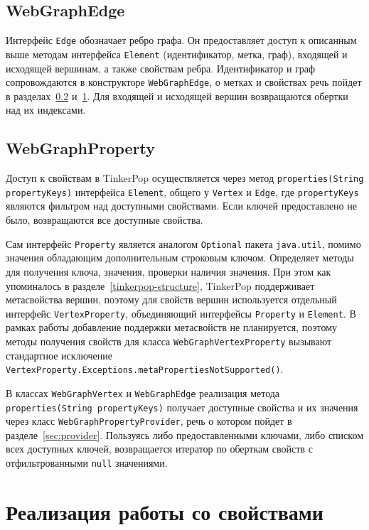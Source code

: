 \documentclass[times,specification,annotation]{itmo-student-thesis}
\begin{document}
\subsection{WebGraphEdge}\label{subsec:webgraphedge}

Интерфейс \texttt{Edge} обозначает ребро графа. Он предоставляет доступ к описанным выше методам интерфейса \texttt{Element} (идентификатор, метка, граф), входящей и исходящей вершинам, а также свойствам ребра. Идентификатор и граф сопровождаются в конструкторе \texttt{WebGraphEdge}, о метках и свойствах речь пойдет в разделах~\ref{subsec:webgraphproperty} и~\ref{sec:props}.
Для входящей и исходящей вершин возвращаются обертки над их индексами.

\subsection{WebGraphProperty}\label{subsec:webgraphproperty}

Доступ к свойствам в TinkerPop осуществляется через метод \texttt{properties(String propertyKeys)} интерфейса \texttt{Element}, общего у \texttt{Vertex} и \texttt{Edge}, где \texttt{propertyKeys} являются фильтром над доступными свойствами. Если ключей предоставлено не было, возвращаются все доступные свойства.

Сам интерфейс \texttt{Property} является аналогом \texttt{Optional} пакета \texttt{java.util}, помимо значения обладающим дополнительным строковым ключом. Определяет методы для получения ключа, значения, проверки наличия значения. При этом как упоминалось в разделе~\ref{tinkerpop-structure}, TinkerPop поддерживает метасвойства вершин, поэтому для свойств вершин используется отдельный интерфейс \texttt{VertexProperty}, объединяющий интерфейсы \texttt{Property} и \texttt{Element}. В рамках работы добавление поддержки метасвойств не планируется, поэтому методы получения свойств для класса \texttt{WebGraphVertexProperty} вызывают стандартное исключение \texttt{VertexProperty.Exceptions.metaPropertiesNotSupported()}.

В классах \texttt{WebGraphVertex} и \texttt{WebGraphEdge} реализация метода \texttt{properties(String propertyKeys)} получает доступные свойства и их значения через класс \texttt{WebGraphPropertyProvider}, речь о котором пойдет в разделе~\ref{sec:provider}. Пользуясь либо предоставленными ключами, либо списком всех доступных ключей, возвращается итератор по оберткам свойств с отфильтрованными \texttt{null} значениями.

\section{Реализация работы со свойствами}\label{sec:props}
\end{document}
